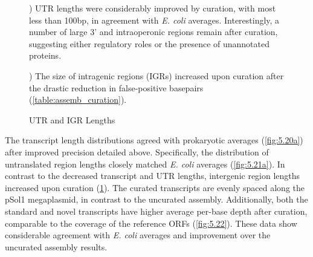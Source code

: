 \begin{figure}
\begin{center}
\begin{minipage}{.48\textwidth}
\begin{center}
{\label{fig:5.21b}}
\end{center}
\end{minipage}%
\end{center}
\caption{UTR and IGR Lengths}
) UTR lengths were considerably improved by curation, with most less than 100bp, in agreement with \textit{E. coli} averages.\cite{87} Interestingly, a number of large 3' and intraoperonic regions remain after curation, suggesting either regulatory roles or the presence of unannotated proteins.

) The size of intragenic regions (IGRs) increased upon curation after the drastic reduction in false-positive basepairs (\ref{table:assemb_curation}).
\end{figure}

The transcript length distributions agreed with prokaryotic averages (\ref{fig:5.20a}) after improved precision detailed above.\cite{86} Specifically, the distribution of untranslated region lengths closely matched \textit{E. coli} averages\cite{87} (\ref{fig:5.21a}). In contrast to the decreased transcript and UTR lengths, intergenic region lengths increased upon curation (\ref{fig:5.21b}). The curated transcripts are evenly spaced along the pSol1 megaplasmid, in contrast to the uncurated assembly. Additionally, both the standard and novel transcripts have higher average per-base depth after curation, comparable to the coverage of the reference ORFs (\ref{fig:5.22}). These data show considerable agreement with \textit{E. coli} averages and improvement over the uncurated assembly results.



